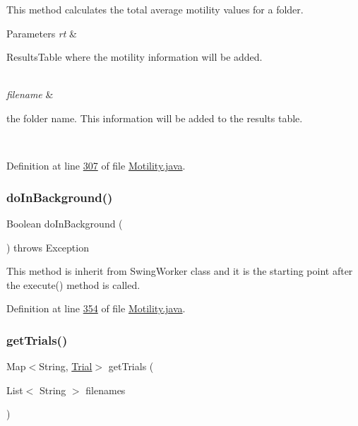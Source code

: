 This method calculates the total average motility values for a folder.


\begin{DoxyParams}{Parameters}
{\em rt} & 
\begin{DoxyItemize}
\item Results\+Table where the motility information will be added. 
\end{DoxyItemize}\\
\hline
{\em filename} & 
\begin{DoxyItemize}
\item the folder name. This information will be added to the results table. 
\end{DoxyItemize}\\
\hline
\end{DoxyParams}


Definition at line \hyperlink{_motility_8java_source_l00307}{307} of file \hyperlink{_motility_8java_source}{Motility.\+java}.

\hypertarget{classanalysis_1_1_motility_ab048bf7b5ce8c46bb48b99b8d0999110}{}\label{classanalysis_1_1_motility_ab048bf7b5ce8c46bb48b99b8d0999110} 
\subsubsection{\texorpdfstring{do\+In\+Background()}{doInBackground()}}
{\footnotesize\ttfamily Boolean do\+In\+Background (\begin{DoxyParamCaption}{ }\end{DoxyParamCaption}) throws Exception\hspace{0.3cm}{\ttfamily [protected]}}

This method is inherit from Swing\+Worker class and it is the starting point after the execute() method is called. 

Definition at line \hyperlink{_motility_8java_source_l00354}{354} of file \hyperlink{_motility_8java_source}{Motility.\+java}.

\hypertarget{classanalysis_1_1_motility_a5580224f7f7e9df7d925ad14f9364d98}{}\label{classanalysis_1_1_motility_a5580224f7f7e9df7d925ad14f9364d98} 
\subsubsection{\texorpdfstring{get\+Trials()}{getTrials()}}
{\footnotesize\ttfamily Map$<$String, \hyperlink{classdata_1_1_trial}{Trial}$>$ get\+Trials (\begin{DoxyParamCaption}\item[{List$<$ String $>$}]{filenames }\end{DoxyParamCaption})\hspace{0.3cm}{\ttfamily [private]}}

